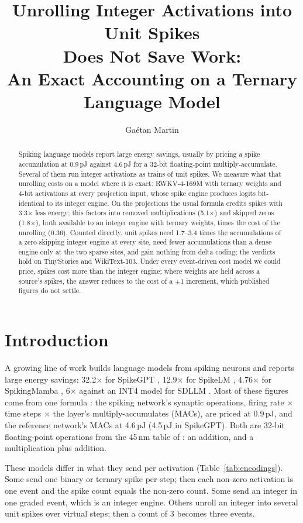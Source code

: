 \documentclass[11pt]{article}
\title{Unrolling Integer Activations into Unit Spikes\\
Does Not Save Work:\\
An Exact Accounting on a Ternary Language Model}
\author{Ga\'etan Martin}
\date{}
\newcommand{\x}{$\times$}
\begin{document}
\maketitle

\begin{abstract}
Spiking language models report large energy savings, usually by pricing a spike accumulation at
0.9\,pJ against 4.6\,pJ for a 32-bit floating-point multiply-accumulate. Several of them run
integer activations as trains of unit spikes. We measure what that unrolling costs on a model
where it is exact: RWKV-4-169M with ternary weights and 4-bit activations at every projection
input, whose spike engine produces logits bit-identical to its integer engine. On the
projections the usual formula credits spikes with 3.3\x{} less energy; this factors into removed
multiplications (5.1\x) and skipped zeros (1.8\x), both available to an integer engine with
ternary weights, times the cost of the unrolling (0.36). Counted directly, unit spikes need
1.7--3.4 times the accumulations of a zero-skipping integer engine at every site, need fewer
accumulations than a dense engine only at the two sparse sites, and gain nothing from delta
coding; the verdicts hold on TinyStories and WikiText-103. Under every event-driven cost model
we could price, spikes cost more than the integer engine; where weights are held across a
source's spikes, the answer reduces to the cost of a $\pm 1$ increment, which published figures
do not settle.
\end{abstract}

\section{Introduction}

A growing line of work builds language models from spiking neurons and reports large energy
savings: 32.2\x{} for SpikeGPT \citep{zhu2024spikegpt}, 12.9\x{} for SpikeLM
\citep{xing2024spikelm}, 4.76\x{} for SpikingMamba \citep{huang2026spikingmamba}, 6\x{} against an
INT4 model for SDLLM \citep{xu2026sdllm}. Most of these figures come from one formula
\citep{zhou2023spikformer,yao2023sdt}: the spiking network's synaptic operations, firing rate
\x{} time steps \x{} the layer's multiply-accumulates (MACs), are priced at 0.9\,pJ, and the
reference network's MACs at 4.6\,pJ (4.5\,pJ in SpikeGPT). Both are 32-bit floating-point
operations from the 45\,nm table of \citet{horowitz2014}: an addition, and a multiplication plus
addition.

These models differ in what they send per activation (Table~\ref{tab:encodings}). Some send one
binary or ternary spike per step; then each non-zero activation is one event and the spike count
equals the non-zero count. Some send an integer in one graded event, which is an integer engine.
Others unroll an integer into several unit spikes over virtual steps; then a count of 3 becomes
three events.
\end{document}
